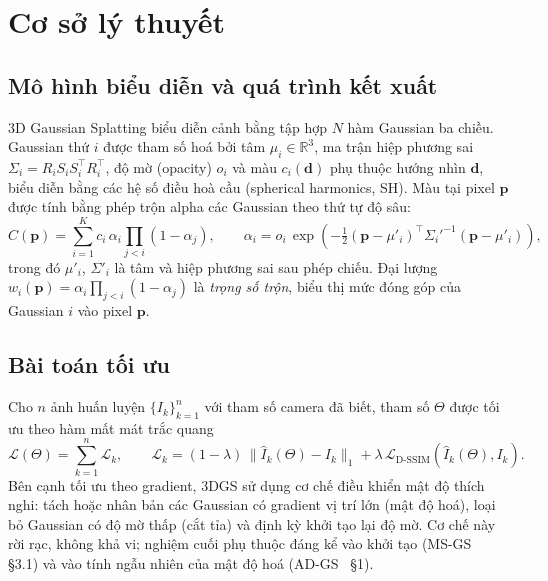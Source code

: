 \documentclass[11pt,a4paper]{article}
\begin{document}
\tableofcontents
\newpage

\section{Cơ sở lý thuyết}
\label{sec:background}

\subsection{Mô hình biểu diễn và quá trình kết xuất}
3D Gaussian Splatting biểu diễn cảnh bằng tập hợp $N$ hàm Gaussian ba chiều. Gaussian thứ $i$ được tham số hoá bởi tâm $\mu_i\in\mathbb{R}^3$, ma trận hiệp phương sai $\Sigma_i = R_iS_iS_i^\top R_i^\top$, độ mờ (opacity) $o_i$ và màu $c_i(\mathbf{d})$ phụ thuộc hướng nhìn $\mathbf{d}$, biểu diễn bằng các hệ số điều hoà cầu (spherical harmonics, SH). Màu tại pixel $\mathbf{p}$ được tính bằng phép trộn alpha các Gaussian theo thứ tự độ sâu:
\begin{equation}
\hat C(\mathbf{p}) = \sum_{i=1}^{K} c_i\,\alpha_i \prod_{j<i}(1-\alpha_j), \qquad
\alpha_i = o_i\,\exp\!\left(-\tfrac12(\mathbf{p}-\mu'_i)^\top \Sigma_i'^{-1}(\mathbf{p}-\mu'_i)\right),
\label{eq:blend}
\end{equation}
trong đó $\mu'_i$, $\Sigma'_i$ là tâm và hiệp phương sai sau phép chiếu. Đại lượng $w_i(\mathbf{p})=\alpha_i\prod_{j<i}(1-\alpha_j)$ là \emph{trọng số trộn}, biểu thị mức đóng góp của Gaussian $i$ vào pixel $\mathbf{p}$.

\subsection{Bài toán tối ưu}
Cho $n$ ảnh huấn luyện $\{I_k\}_{k=1}^n$ với tham số camera đã biết, tham số $\Theta$ được tối ưu theo hàm mất mát trắc quang
\begin{equation}
\mathcal{L}(\Theta) = \sum_{k=1}^{n} \mathcal{L}_k, \qquad
\mathcal{L}_k = (1-\lambda)\,\lVert \hat I_k(\Theta) - I_k\rVert_1 + \lambda\,\mathcal{L}_{\text{D-SSIM}}(\hat I_k(\Theta), I_k).
\label{eq:loss}
\end{equation}
Bên cạnh tối ưu theo gradient, 3DGS sử dụng cơ chế điều khiển mật độ thích nghi: tách hoặc nhân bản các Gaussian có gradient vị trí lớn (mật độ hoá), loại bỏ Gaussian có độ mờ thấp (cắt tỉa) và định kỳ khởi tạo lại độ mờ. Cơ chế này rời rạc, không khả vi; nghiệm cuối phụ thuộc đáng kể vào khởi tạo (MS-GS~\cite{msgs} §3.1) và vào tính ngẫu nhiên của mật độ hoá (AD-GS~\cite{adgs} §1).
\end{document}
